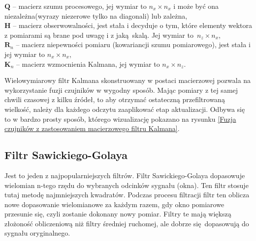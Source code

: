 {{{        $\bm{Q}$ -- macierz szumu procesowego, jej wymiar to $n_x \times n_x$ i może być ona niezależna(wyrazy niezerowe tylko na diagonali) lub zależna,\\
        $\bm{H}$ -- macierz obserwowalności, jest stała i decyduje o tym, które elementy wektora z pomiarami są brane pod uwagę i z jaką skalą. Jej wymiar to~$n_z \times n_x$,\\
        $\bm{R}_n$ -- macierz niepewności pomiaru (kowariancji szumu pomiarowego), jest stała i jej wymiar to $n_x \times n_x$,\\
        $\bm{K}_n$ -- macierz wzmocnienia Kalmana, jej wymiar to $n_x \times n_z$.\\

        \newpage

        Wielowymiarowy filtr Kalmana skonstruowany w postaci macierzowej pozwala na wykorzystanie fuzji czujników w wygodny sposób. Mając pomiary z tej samej chwili czasowej z kilku źródeł, to aby otrzymać ostateczną przefiltrowaną wielkość, należy dla każdego odczytu zaaplikować etap aktualizacji. Odbywa się to w bardzo prosty sposób, którego wizualizację pokazano na rysunku \ref{Fuzja czujników z zastosowaniem macierzowego filtru Kalmana}.

    }
    \subsection{Filtr Sawickiego-Golaya}
    {
        Jest to jeden z najpopularniejszych filtrów. Filtr Sawickiego-Golaya \cite{filters} dopasowuje wielomian n-tego rzędu do wybranych odcinków sygnału (okna). Ten filtr stosuje tutaj metodę najmniejszych kwadratów. Podczas procesu filtracji filtr ten oblicza nowe dopasowanie wielomianowe za każdym razem, gdy okno pomiarowe przesunie się, czyli  zostanie dokonany nowy pomiar. Filtry te mają większą złożoność obliczeniową niż filtry średniej ruchomej, ale dobrze się dopasowują do sygnału oryginalnego.
    }
    }
}